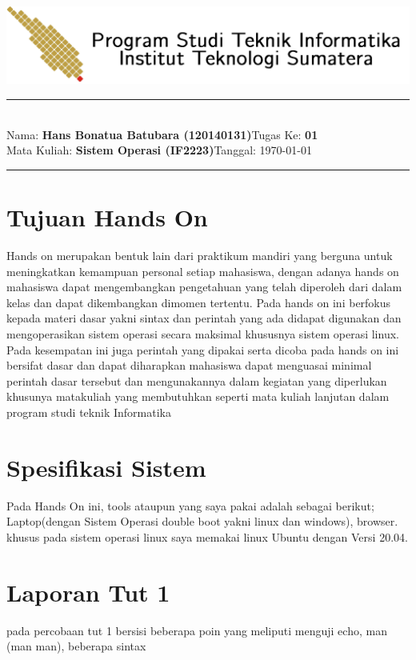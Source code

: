 \documentclass[11pt,a4paper]{article}
\newcommand{\stuid}{120140131}
\newcommand{\student}{\textbf{Hans Bonatua Batubara (\stuid{})}}
\newcommand{\course}{\textbf{Sistem Operasi (IF2223)}}
\newcommand{\assignment}{\textbf{01}} %
\begin{document}
\thispagestyle{empty}
\begin{center}
	\includegraphics[scale = 0.15]{Figure/ifitera-header.png}
	\vspace{0.1cm}
\end{center}
\noindent
{\large
\rule{17cm}{0.2cm}\\[0.3cm]
Nama: \student \hfill Tugas Ke: \assignment\\[0.1cm]
Mata Kuliah: \course \hfill Tanggal: \today\\
\rule{17cm}{0.05cm}
\vspace{0.1cm}
}


\section{Tujuan Hands On }
    Hands on merupakan bentuk lain dari praktikum mandiri yang berguna untuk meningkatkan kemampuan personal setiap mahasiswa, dengan adanya hands on mahasiswa dapat mengembangkan pengetahuan yang telah diperoleh dari dalam kelas dan dapat dikembangkan dimomen tertentu. Pada hands on ini berfokus kepada materi dasar yakni sintax dan perintah yang ada didapat digunakan dan mengoperasikan sistem operasi secara maksimal khususnya sistem operasi linux. Pada kesempatan ini juga perintah yang dipakai serta dicoba pada hands on ini bersifat dasar dan dapat diharapkan mahasiswa dapat menguasai minimal perintah dasar tersebut dan mengunakannya dalam kegiatan yang diperlukan khusunya matakuliah yang membutuhkan seperti mata kuliah lanjutan dalam program studi teknik Informatika 


\section{Spesifikasi Sistem}
    Pada Hands On ini, tools ataupun yang saya pakai adalah sebagai berikut; Laptop(dengan Sistem Operasi double boot yakni linux dan windows), browser. khusus pada sistem operasi linux saya memakai linux Ubuntu dengan Versi 20.04.
\newpage
\section{Laporan Tut 1}
pada percobaan tut 1 bersisi beberapa poin yang meliputi menguji echo, man (man man), beberapa sintax
\end{document}
